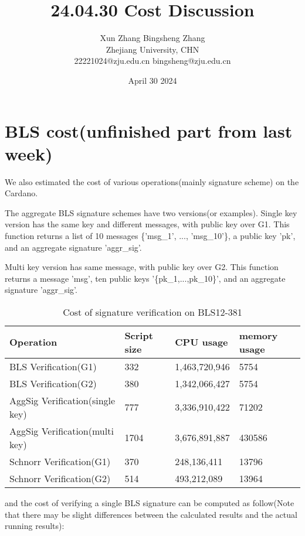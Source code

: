 \documentclass{article}
\title{24.04.30 Cost Discussion}
\author{Xun Zhang \quad \quad Bingsheng Zhang \\ 
Zhejiang University, CHN \\
22221024@zju.edu.cn \quad bingsheng@zju.edu.cn}
\date{April 30 2024}
\begin{document}
\maketitle

\section{BLS cost(unfinished part from last week)}

We also estimated the cost of various operations(mainly signature scheme) on the Cardano.

The aggregate BLS signature schemes have two versions(or examples). Single key version has the same key and different messages, with public key over G1. This
function returns a list of 10 messages \{'msg\_1', ..., 'msg\_10'\}, a public key 'pk', and an aggregate signature 'aggr\_sig'.

Multi key version has same message, with public key over G2. This function returns a message 'msg', ten public keys '\{pk\_1,...,pk\_10\}', and an aggregate signature 'aggr\_sig'.


\begin{table}[H]
    \centering
    \begin{tabular}{p{5cm}|p{2cm}|p{2.5cm}|p{2.5cm}} \hline
         Operation& Script size & CPU usage& memory usage  \\ \hline
         BLS Verification(G1)& 332  &    1,463,720,946   &  5754 \\ \hline
         BLS Verification(G2)& 380  &    1,342,066,427   &  5754 \\ \hline
         AggSig Verification(single key) &  777  &     3,336,910,422 &        71202   \\ \hline
         AggSig Verification(multi key) & 1704  &    3,676,891,887          &430586   \\ \hline
         Schnorr Verification(G1)  & 370   &     248,136,411   &          13796 \\ \hline
         Schnorr Verification(G2)  & 514    &    493,212,089    &         13964 \\ \hline
    \end{tabular}
    \caption{Cost of signature verification on BLS12-381}
    \label{tab:my_label}
\end{table}

and the cost of verifying a single BLS signature can be computed as follow(Note that there may be slight differences between the calculated results and the actual running results):
\end{document}
